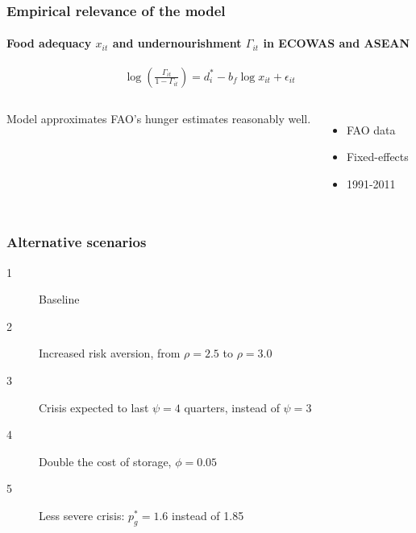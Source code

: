\documentclass[svgnames]{beamer}
\begin{document}
\begin{frame}[label=hunger-ECOWAS]
\frametitle{Empirical relevance of the model}
\framesubtitle{Food adequacy $x_{it}$ and undernourishment $\Gamma_{it}$ in ECOWAS and ASEAN}
\begin{equation}
   \log\left(\tfrac{\Gamma_{it}}{1-\Gamma_{it}}\right) = d_i^* - b_f\log x_{it} +  \epsilon_{it}
\end{equation}
\begin{columns}
  \small{Model approximates FAO's hunger estimates reasonably well.}
  \scriptsize{
  \begin{itemize}
    \item FAO data
    \item Fixed-effects
    \item 1991-2011
  \end{itemize}
  }

\end{columns}
\end{frame}


\begin{frame}
\frametitle{Alternative scenarios}
\begin{description}
\item[1] Baseline
\item[2] Increased risk aversion, from $\rho=2.5$ to $\rho=3.0$
\item[3] Crisis expected to last $\psi=4$ quarters,  instead of $\psi=3$
\item[4] Double the cost of storage, $\phi=0.05$
\item[5] Less severe crisis: $p^*_g=1.6$ instead of 1.85
\end{description}
\end{frame}
\end{document}
